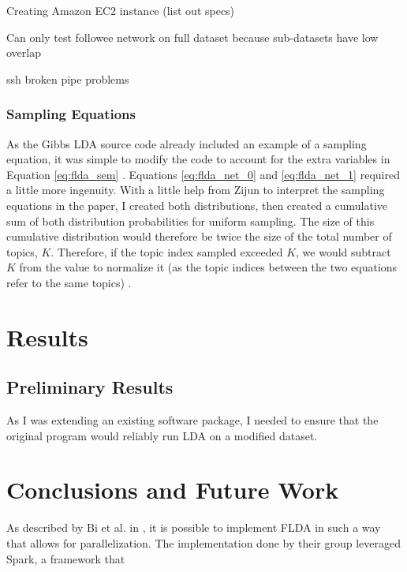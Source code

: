 \documentclass[a4paper]{article}
\begin{document}
Creating Amazon EC2 instance (list out specs)

Can only test followee network on full dataset because sub-datasets have low overlap

ssh broken pipe problems

\subsubsection{Sampling Equations}\label{sec:samp_eqns}
As the Gibbs LDA source code already included an example of a sampling equation, it was simple to modify the code to account for the extra variables in Equation \ref{eq:flda_sem} \cite{gibbs_lda}. Equations \ref{eq:flda_net_0} and \ref{eq:flda_net_1} required a little more ingenuity. With a little help from Zijun to interpret the sampling equations in the paper, I created both distributions, then created a cumulative sum of both distribution probabilities for uniform sampling. The size of this cumulative distribution would therefore be twice the size of the total number of topics, $K$. Therefore, if the topic index sampled exceeded $K$, we would subtract $K$ from the value to normalize it (as the topic indices between the two equations refer to the same topics) \cite{flda}.

\section{Results}
\label{sec:results}
\subsection{Preliminary Results}
As I was extending an existing software package, I needed to ensure that the original program would reliably run LDA on a modified dataset.


\section{Conclusions and Future Work}
\label{sec:conc}

As described by Bi et al. in \cite{flda}, it is possible to implement FLDA in such a way that allows for parallelization. The implementation done by their group leveraged Spark, a framework that 
\end{document}
